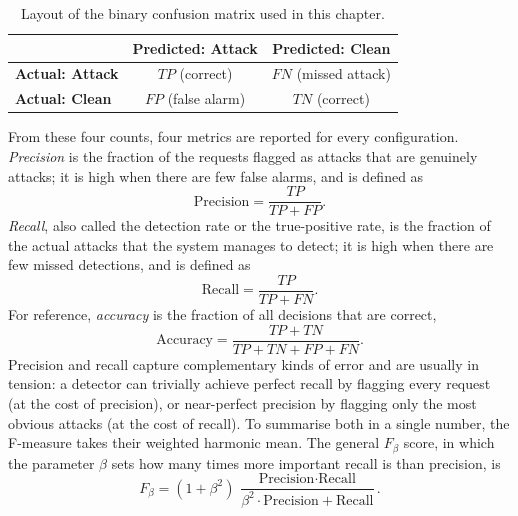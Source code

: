 \documentclass[../main.tex]{subfiles}
\begin{document}
\begin{table}[H]
  \centering
  \caption{Layout of the binary confusion matrix used in this chapter.}
  \label{tab:cm}
  \renewcommand{\arraystretch}{1.35}
  \setlength{\tabcolsep}{10pt}
  \footnotesize
  \begin{tabular}{|l|c|c|}
    \hline
    & \textbf{Predicted: Attack} & \textbf{Predicted: Clean} \\
    \hline
    \textbf{Actual: Attack} & $TP$ (correct) & $FN$ (missed attack) \\
    \hline
    \textbf{Actual: Clean} & $FP$ (false alarm) & $TN$ (correct) \\
    \hline
  \end{tabular}
\end{table}

From these four counts, four metrics are reported for every configuration.
\emph{Precision} is the fraction of the requests flagged as attacks that are
genuinely attacks; it is high when there are few false alarms, and is defined
as
\begin{equation}
  \text{Precision} = \frac{TP}{TP + FP}.
  \label{eq:precision}
\end{equation}
\emph{Recall}, also called the detection rate or the true-positive rate, is
the fraction of the actual attacks that the system manages to detect; it is
high when there are few missed detections, and is defined as
\begin{equation}
  \text{Recall} = \frac{TP}{TP + FN}.
  \label{eq:recall}
\end{equation}
For reference, \emph{accuracy} is the fraction of all decisions that are
correct,
\begin{equation}
  \text{Accuracy} = \frac{TP + TN}{TP + TN + FP + FN}.
  \label{eq:accuracy}
\end{equation}
Precision and recall capture complementary kinds of error and are usually in
tension: a detector can trivially achieve perfect recall by flagging every
request (at the cost of precision), or near-perfect precision by flagging only
the most obvious attacks (at the cost of recall). To summarise both in a
single number, the F-measure takes their weighted harmonic mean. The general
$F_\beta$ score, in which the parameter $\beta$ sets how many times more
important recall is than precision, is
\begin{equation}
  F_\beta = (1 + \beta^2)\,\frac{\text{Precision} \cdot \text{Recall}}
                 {\beta^2 \cdot \text{Precision} + \text{Recall}}.
  \label{eq:fbeta}
\end{equation}
\end{document}
